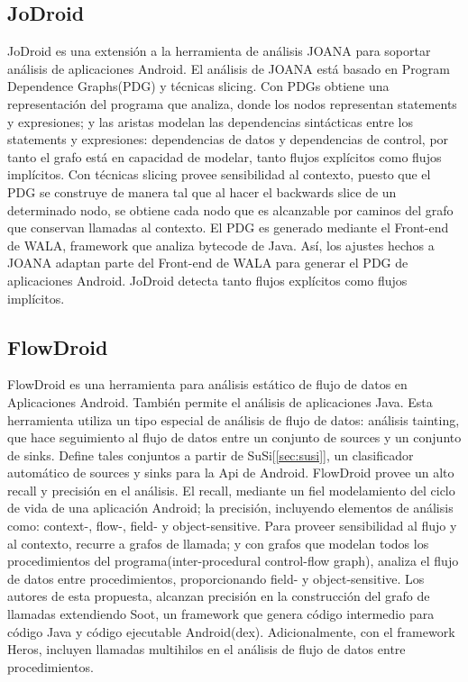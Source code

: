 \subsection{JoDroid}
\label{subsec:jod}
JoDroid\cite{JoDroid-Paper} es una extensión a la herramienta de análisis JOANA
para soportar análisis de aplicaciones Android.\newline 
El análisis de JOANA está basado en Program Dependence Graphs(PDG) y técnicas
slicing. Con PDGs obtiene una representación del programa que
analiza, donde los nodos representan statements y expresiones; y las aristas
modelan las dependencias sintácticas entre los statements y expresiones:
dependencias de datos y dependencias de control, por tanto el grafo está en
capacidad de modelar, tanto flujos explícitos como flujos implícitos.\newline
Con técnicas slicing provee sensibilidad al contexto, puesto que el PDG se
construye de manera tal que al hacer el backwards slice de un determinado nodo,
se obtiene cada nodo que es alcanzable por caminos del grafo que conservan
llamadas al contexto.\newline
El PDG es generado mediante el Front-end de WALA, framework que analiza bytecode
de Java. Así, los ajustes hechos a JOANA adaptan parte del Front-end de WALA
para generar el PDG de aplicaciones Android.\newline
JoDroid detecta tanto flujos explícitos como flujos implícitos.

\subsection{FlowDroid}
\label{FlowDroid-Tool}
FlowDroid es una herramienta para análisis estático de flujo de datos en
Aplicaciones Android. También permite el análisis de aplicaciones Java.\newline
Esta herramienta utiliza un tipo especial de análisis de flujo de datos:
análisis tainting, que hace seguimiento al flujo de datos entre un conjunto de
sources y un conjunto de sinks. Define tales conjuntos a partir de
SuSi[\ref{sec:susi}], un clasificador automático de sources y sinks para la Api
de Android.\newline 
FlowDroid provee un alto recall y precisión\cite{FlowDroid-Thesis} en el
análisis. El recall, mediante un fiel modelamiento del ciclo de vida de una
aplicación Android; la precisión, incluyendo elementos de análisis como:
context-, flow-, field- y object-sensitive. Para proveer sensibilidad al flujo y
al contexto, recurre a grafos de llamada; y con grafos que modelan todos los
procedimientos del programa(inter-procedural control-flow graph), analiza el
flujo de datos entre procedimientos, proporcionando field- y object-sensitive.\newline
Los autores de esta propuesta, alcanzan precisión en la construcción del grafo
de llamadas extendiendo Soot\cite{Soot}, un framework que genera código
intermedio para código Java y código ejecutable Android(dex). Adicionalmente,
con el framework Heros\cite{heros}, incluyen llamadas multihilos en el análisis
de flujo de datos entre procedimientos.

